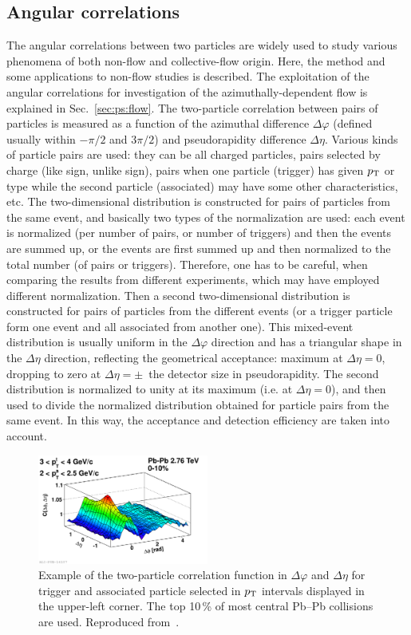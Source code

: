 \subsection{Angular correlations}
\label{subsecks:angular}
The angular correlations between two particles are widely used to study various phenomena of both non-flow and collective-flow origin. Here, the method and some applications to non-flow studies is described. The exploitation of the angular correlations for investigation of the azimuthally-dependent flow is explained in Sec.~\ref{sec:ps:flow}. The two-particle correlation between pairs of particles is measured as a function of the azimuthal difference $\Delta\varphi$ (defined usually within $−\pi/2$ and $3\pi/2$) and pseudorapidity difference $\Delta\eta$. Various kinds of particle pairs are used: they can be all charged particles, pairs selected by charge (like sign, unlike sign), pairs when one particle (trigger) has given $p_{\rm T}$ or type while the second particle (associated) may have some other characteristics, etc. The two-dimensional distribution is constructed for pairs of particles from the same event, and basically two types of the normalization are used: each event is normalized (per number of pairs, or number of triggers) and then the events are summed up, or the events are first summed up and then normalized to the total number (of pairs or triggers). Therefore, one has to be careful, when comparing the results from different experiments, which may have employed different normalization. Then a second two-dimensional distribution is constructed for pairs of particles from the different events (or a trigger particle form one event and all associated from another one). This mixed-event distribution is usually uniform in the $\Delta\varphi$ direction and has a triangular shape in the $\Delta\eta$ direction, reflecting the geometrical acceptance: maximum at $\Delta\eta = 0$, dropping to zero at $\Delta\eta = \pm$~the detector size in pseudorapidity. The second distribution is normalized to unity at its maximum (i.e. at $\Delta\eta = 0$), and then used to divide the normalized distribution obtained for particle pairs from the same event. In this way, the acceptance and detection efficiency are taken into account.

\begin{figure}
\centering
\includegraphics[width=0.5\textwidth]{ksfigures/TwoParticleCorrFunction.pdf}
\caption{Example of the two-particle correlation function in $\Delta\varphi$ and $\Delta\eta$ for trigger and associated particle selected in $p_{\rm T}$ intervals displayed in the upper-left corner. The top 10\,\% of most central Pb--Pb collisions are used. Reproduced from~\cite{Aamodt:2011by}.}
\label{figks:CorrExamle}
\end{figure}


